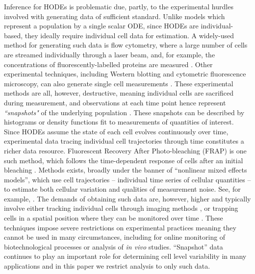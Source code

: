 Inference for HODEs is problematic due, partly, to the experimental hurdles involved with generating data of sufficient standard. Unlike models which represent a population by a single scalar ODE, since HODEs are individual-based, they ideally require individual cell data for estimation. A widely-used method for generating such data is flow cytometry, where a large number of cells are streamed individually through a laser beam, and, for example, the concentrations of fluorescently-labelled proteins are measured \cite{telford2012flow}. Other experimental techniques, including Western blotting and cytometric fluorescence microscopy, can also generate single cell measurements \cite{hughes2014single,hasenauer2011identification}. These experimental methods are all, however, destructive, meaning individual cells are sacrificed during measurement, and observations at each time point hence represent \emph{``snapshots"} of the underlying population \cite{hasenauer2011identification}. These snapshots can be described by histograms \cite{dixit2018maximum} or density functions \cite{waldherr2018estimation} fit to measurements of quantities of interest. Since HODEs assume the state of each cell evolves continuously over time, experimental data tracing individual cell trajectories through time constitutes a richer data resource. Fluorescent Recovery After Photo-bleaching (FRAP) is one such method, which follows the time-dependent response of cells after an initial bleaching \cite{karlsson2015nonlinear}. Methods exists, broadly under the banner of ``nonlinear mixed effects models'', which use cell trajectories -- individual time series of cellular quantities -- to estimate both cellular variation and qualities of measurement noise. See, for example, \cite{karlsson2015nonlinear,zechner2014scalable,dharmarajan2019simple}. The demands of obtaining such data are, however, higher and typically involve either tracking individual cells through imaging methods \cite{hilsenbeck2016software}, or trapping cells in a spatial position where they can be monitored over time \cite{fritzsch2012single}. These techniques impose severe restrictions on experimental practices meaning they cannot be used in many circumstances, including for online monitoring of biotechnological processes or analysis of \textit{in vivo} studies. ``Snapshot'' data continues to play an important role for determining cell level variability in many applications and in this paper we restrict analysis to only such data.

